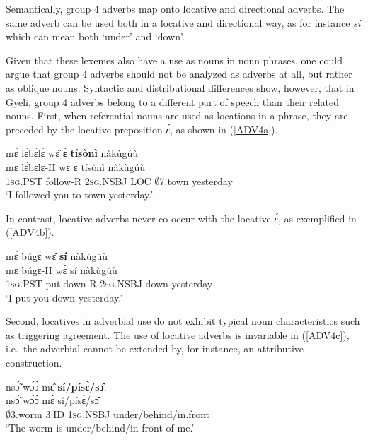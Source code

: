 \noindent Semantically, group 4 adverbs map onto locative and directional adverbs. The same adverb can be used both in a locative and directional way, as for instance {\itshape sí} which can mean both `under' and `down'. 

Given that these lexemes also have a use as nouns in noun phrases, one could argue that group 4 adverbs should not be analyzed as adverbs at all, but rather as oblique nouns. Syntactic and distributional differences show, however, that in Gyeli, group 4 adverbs belong to a different part of speech than their related nouns. First, when referential nouns are used as locations in a phrase, they are preceded by the locative preposition {\itshape ɛ́}, as shown in (\ref{ADV4a}). 

\begin{exe} 
\ex\label{ADV4a}
\glll mɛ̀ lɛ̀bɛ́lɛ́ wɛ̂ {\bfseries ɛ́}  {\bfseries tísònì} nàkùgúù \\
      mɛ lɛ̀bɛlɛ-H wɛ̀ ɛ́ tísònì nàkùgúù \\
     1\textsc{sg}.PST follow-R 2\textsc{sg}.NSBJ LOC $\emptyset$7.town yesterday \\
    \trans `I followed you to town yesterday.'
\end{exe}

\noindent In contrast, locative adverbs never co-occur with the locative {\itshape ɛ́}, as exemplified in (\ref{ADV4b}).

\begin{exe} 
\ex\label{ADV4b}
\glll mɛ̀ búgɛ́ wɛ̂ {\bfseries sí} nàkùgúù  \\
      mɛ búgɛ-H wɛ̀ sí nàkùgúù \\
     1\textsc{sg}.PST put.down-R 2\textsc{sg}.NSBJ down yesterday \\
    \trans `I put you down yesterday.'
\end{exe}

Second, locatives in adverbial use do not exhibit typical noun characteristics such as triggering agreement. The use of locative adverbs is invariable in (\ref{ADV4c}), i.e.\  the adverbial cannot be extended by, for instance, an attributive construction.

\begin{exe} 
\ex\label{ADV4c}
\glll nsɔ̃́ wɔ́ɔ̀ mɛ̂ {\bfseries sí/písɛ̀/sɔ̂}. \\
      nsɔ̃́ wɔ́ɔ̀ mɛ̀ sí/písɛ̀/sɔ̂ \\
      $\emptyset$3.worm 3:ID 1\textsc{sg}.NSBJ under/behind/in.front \\
\trans `The worm is under/behind/in front of me.'
\end{exe}

